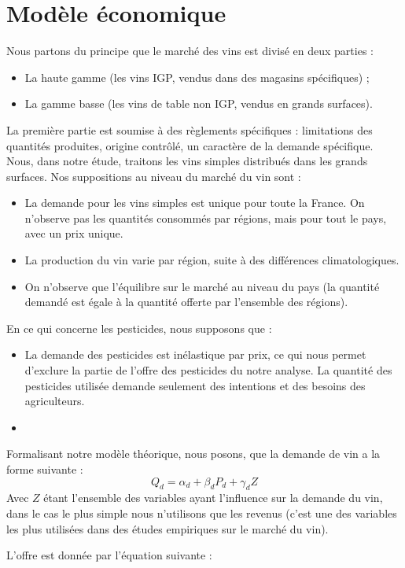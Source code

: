 \documentclass[11pt, a4paper]{article}
\begin{document}
\section*{Modèle économique}
Nous partons du principe que le marché des vins est divisé en deux parties :
\begin{itemize}
    \item La haute gamme (les vins IGP, vendus dans des magasins spécifiques) ;
    \item La gamme basse (les vins de table non IGP, vendus en grands surfaces).
\end{itemize}
La première partie est soumise à des règlements spécifiques : limitations des quantités produites, origine contrôlé, un caractère de la demande spécifique. 
Nous, dans notre étude, traitons les vins simples distribués dans les grands surfaces.
Nos suppositions au niveau du marché du vin sont :
\begin{itemize}
    \item La demande pour les vins simples est unique pour toute la France. On n'observe pas les quantités consommés par régions, mais pour tout le pays, avec un prix unique. 
    \item La production du vin varie par région, suite à des différences climatologiques.
    \item On n'observe que l'équilibre sur le marché au niveau du pays (la quantité demandé est égale à la quantité offerte par l'ensemble des régions).
\end{itemize}
En ce qui concerne les pesticides, nous supposons que :
\begin{itemize}
    \item La demande des pesticides est inélastique par prix, ce qui nous permet d'exclure la partie de l'offre des pesticides du notre analyse. La quantité des pesticides utilisée demande seulement des intentions et des besoins des agriculteurs. 
    \item 
\end{itemize}
Formalisant notre modèle théorique, nous posons, que la demande de vin a la forme suivante :
\begin{equation}
    Q_d = \alpha_d + \beta_d P_d + \gamma_d Z 
\end{equation}
Avec $Z$ étant l'ensemble des variables ayant l'influence sur la demande du vin, dans le cas le plus simple nous n'utilisons que les revenus (c'est une des variables les plus utilisées dans des études empiriques sur le marché du vin).
\par
L'offre est donnée par l'équation suivante : 
\end{document}
